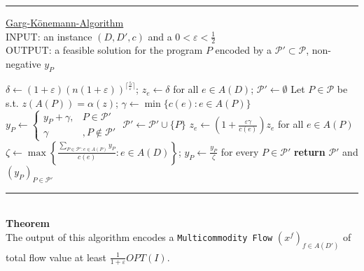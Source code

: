 \documentclass[a4paper, 12pt]{article}
\begin{document}
	\par\noindent\rule{\textwidth}{0.4pt}
	\underline{Garg-Könemann-Algorithm}\\
	INPUT: an instance $(D,D',c)$ and a $0 < \varepsilon < \frac{1}{2}$\\
	OUTPUT: a feasible solution for the program $P$ encoded by a $\mathcal{P}' \subset \mathcal{P}$, non-negative $y_P$
	\begin{algorithmic}[1]
		\State $\delta \gets (1+\varepsilon)(n(1+\varepsilon))^{\lceil \frac{5}{\varepsilon}\rceil}$; $z_e \gets \delta$ for all $e \in A(D)$; $\mathcal{P}' \gets \emptyset$
		\State Let $P \in \mathcal{P}$ be s.t. $z(A(P)) = \alpha(z)$; $\gamma \gets \min \{c(e): e \in A(P)\}$
		\State $y_P \gets \begin{cases}
			y_P + \gamma, & P \in \mathcal{P}'\\
			\gamma&, P \notin \mathcal{P}'
		\end{cases}$
		\State $\mathcal{P}' \gets \mathcal{P}' \cup \{P\}$
		\State $z_e \gets \left(1+\frac{\varepsilon \gamma}{c(e)}\right)z_e$ for all $e \in A(P)$
		\EndWhile
		\State $\zeta \gets \max \left\{\frac{\sum_{P \in \mathcal{P}': e \in A(P)}y_P}{c(e)}: e \in A(D)\right\}$; $y_P \gets \frac{y_P}{\zeta}$ for every $P \in \mathcal{P}'$
		\State \textbf{return} $\mathcal{P}'$ and $(y_P)_{P \in \mathcal{P}'}$
	\end{algorithmic}
	\par\noindent\rule{\textwidth}{0.4pt}\\
	\textbf{Theorem}\\
	The output of this algorithm encodes a \texttt{Multicommodity Flow} $(x^f)_{f \in A(D')}$ of total flow value at least $\frac{1}{1+\varepsilon}OPT(I)$. 
\end{document}
